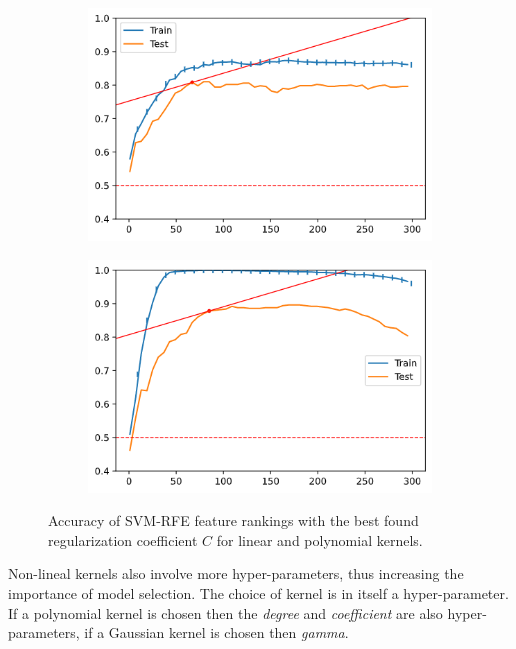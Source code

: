 \begin{figure}[H]
    \centering
    \begin{subfigure}[b]{0.4\linewidth}
        \includegraphics[width=\linewidth]{img/ch5/kernel/art_linear.png}
    \end{subfigure}
    \begin{subfigure}[b]{0.4\linewidth}
        \includegraphics[width=\linewidth]{img/ch5/kernel/art_poly.png}
    \end{subfigure}
    \caption{Accuracy of SVM-RFE feature rankings with the best found regularization coefficient $C$ for linear and polynomial kernels.}
    \label{fig:ch5.kernel.cmp2}
\end{figure}

Non-lineal kernels also involve more hyper-parameters, thus increasing the im\-por\-tance of model selection. The choice of kernel is in itself a hyper-parameter. If a polynomial kernel is chosen then the \emph{degree} and \emph{coefficient} are also hyper-parameters, if a Gaussian kernel is chosen then \emph{gamma}.


